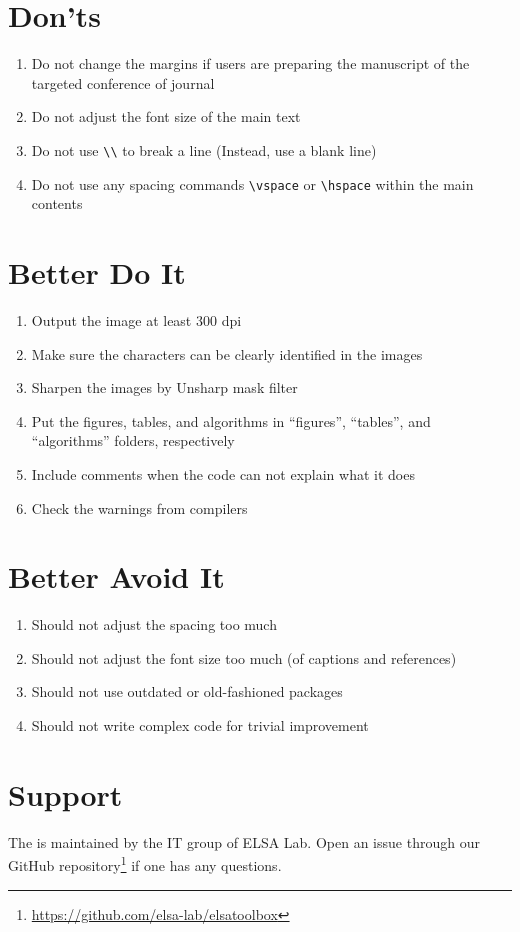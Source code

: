\section*{Don'ts}

\begin{enumerate}
    \item Do not change the margins if users are preparing the manuscript of the targeted conference of journal
    \item Do not adjust the font size of the main text
    \item Do not use \verb|\\| to break a line (Instead, use a blank line)
    \item Do not use any spacing commands \verb|\vspace| or \verb|\hspace| within the main contents
\end{enumerate}

\section*{Better Do It}

\begin{enumerate}
    \item Output the image at least 300 dpi
    \item Make sure the characters can be clearly identified in the images
    \item Sharpen the images by Unsharp mask filter
    \item Put the figures, tables, and algorithms in ``figures'', ``tables'', and ``algorithms'' folders, respectively
    \item Include comments when the code can not explain what it does
    \item Check the warnings from compilers
\end{enumerate}

\section*{Better Avoid It}

\begin{enumerate}
    \item Should not adjust the spacing too much
    \item Should not adjust the font size too much (of captions and references)
    \item Should not use outdated or old-fashioned packages
    \item Should not write complex code for trivial improvement
\end{enumerate}

\section*{Support}

The \elsatoolbox{} is maintained by the IT group of ELSA Lab. Open an issue through our GitHub repository\footnote{\url{https://github.com/elsa-lab/elsatoolbox}} if one has any questions.

